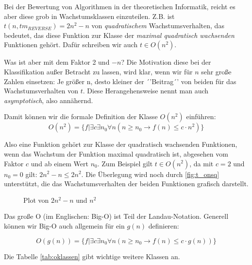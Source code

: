 Bei der Bewertung von Algorithmen in der theoretischen Informatik,
reicht es aber diese grob in Wachstumsklassen einzuteilen.
Z.B. ist $t(n, tm_{REVERSE}) = 2n^2 - n$ von \emph{quadratischem} Wachstumsverhalten,
das bedeutet, das diese Funktion zur Klasse der \emph{maximal quadratisch wachsenden}
Funktionen gehört.
Dafür schreiben wir auch $t \in O(n^2)$.

Was ist aber mit dem Faktor 2 und $-n$?
Die Motivation diese bei der Klassifikation außer Betracht zu lassen, wird
klar, wenn wir für $n$ sehr große Zahlen einsetzen:
Je größer n, desto kleiner der ´'Beitrag´' von beiden für das Wachstumsverhalten von $t$.
Diese Herangehensweise nennt man auch \emph{asymptotisch}, also annähernd.

Damit können wir die formale Definition der Klasse $O(n^2)$ einführen:
\[
O(n^2) = \{f|\exists c \exists n_0 \forall n (n \geq n_0 \rightarrow f(n) \leq c \cdot n^2)\}
\]

Also eine Funktion gehört zur Klasse der quadratisch wachsenden Funktionen,
wenn das Wachstum der Funktion maximal quadratisch ist,
abgesehen vom Faktor $c$ und ab einem Wert $n_0$.
Zum Beispiel gilt $t \in O(n^2)$, da mit $c=2$ und $n_0 = 0$ gilt: $2n^2 -n \leq 2n^2$.
Die Überlegung wird noch durch \autoref{fig:t_onsq} unterstützt,
die das Wachstumsverhalten der beiden Funktionen grafisch darstellt.

\begin{figure}[h]
    \caption{Plot von $2n^2 - n$ und $n^2$}
    \centering
    \label{fig:t_onsq}
\end{figure}


Das große O (im Englischen: Big-O) ist Teil der Landau-Notation.
Generell können wir Big-O auch allgemein für ein $g(n)$ definieren:

\[
O(g(n)) = \{f|\exists c \exists n_0 \forall n (n \geq n_0 \rightarrow f(n) \leq c \cdot g(n))\}
\]

Die Tabelle \autoref{tab:oklassen} gibt wichtige weitere Klassen an.

